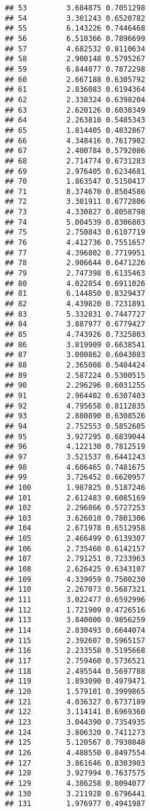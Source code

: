 \documentclass[]{article}
\begin{document}
\begin{verbatim}
## 53         3.684875 0.7051298
## 54         3.301243 0.6520782
## 55         6.143226 0.7446468
## 56         6.510366 0.7896699
## 57         4.682532 0.8110634
## 58         2.900148 0.5795267
## 59         6.844877 0.7872298
## 60         2.667188 0.6305792
## 61         2.836083 0.6194364
## 62         2.338324 0.6398204
## 63         2.620126 0.6030349
## 64         2.263810 0.5485343
## 65         1.814405 0.4832867
## 66         4.348416 0.7617902
## 67         2.400784 0.5792086
## 68         2.714774 0.6731283
## 69         2.976405 0.6234681
## 70         1.863547 0.5150417
## 71         8.374670 0.8504586
## 72         3.301911 0.6772806
## 73         4.330827 0.8058798
## 74         5.004539 0.8306803
## 75         2.750843 0.6107719
## 76         4.412736 0.7551657
## 77         4.396802 0.7719951
## 78         2.906644 0.6471226
## 79         2.747398 0.6135463
## 80         4.022854 0.6911026
## 81         6.144850 0.8329437
## 82         4.439820 0.7231891
## 83         5.332831 0.7447727
## 84         3.887977 0.6779427
## 85         4.743926 0.7325803
## 86         3.819909 0.6638541
## 87         3.000862 0.6043083
## 88         2.365008 0.5404424
## 89         2.587224 0.5300515
## 90         2.296296 0.6031255
## 91         2.964402 0.6307403
## 92         4.795658 0.8112835
## 93         2.880890 0.6308526
## 94         2.752553 0.5852605
## 95         3.927295 0.6839044
## 96         4.122130 0.7812519
## 97         3.521537 0.6441243
## 98         4.606465 0.7481675
## 99         3.726452 0.6620957
## 100        1.987825 0.5187246
## 101        2.612483 0.6085169
## 102        2.296866 0.5727253
## 103        3.626010 0.7801306
## 104        2.671978 0.6512958
## 105        2.466499 0.6139307
## 106        2.735460 0.6142157
## 107        2.791251 0.7233963
## 108        2.626425 0.6343107
## 109        4.339059 0.7500230
## 110        2.267073 0.5687321
## 111        3.022477 0.6592996
## 112        1.721909 0.4726516
## 113        3.840000 0.9856259
## 114        2.830493 0.6644074
## 115        2.392607 0.5965157
## 116        2.233558 0.5195668
## 117        2.759460 0.5736521
## 118        2.495544 0.5697788
## 119        1.893090 0.4979471
## 120        1.579101 0.3999865
## 121        4.036327 0.6737189
## 122        3.114141 0.6969360
## 123        3.044390 0.7354935
## 124        3.806320 0.7411273
## 125        5.120567 0.7930848
## 126        4.488550 0.8497554
## 127        3.861646 0.8303903
## 128        3.927994 0.7637575
## 129        4.386258 0.8094077
## 130        3.211928 0.6796441
## 131        1.976977 0.4941987

\end{verbatim}
\end{document}
